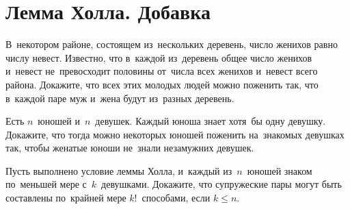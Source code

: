 
\section*{Лемма Холла. Добавка}



\begingroup
    \def\abs#1{\lvert #1 \rvert}

\begin{problems}

\item
В~некотором районе, состоящем из~нескольких деревень, число женихов равно числу
невест.
Известно, что в~каждой из~деревень общее число женихов и~невест не~превосходит
половины от~числа всех женихов и~невест всего района.
Докажите, что всех этих молодых людей можно поженить так, что в~каждой паре муж
и~жена будут из~разных деревень.

\item
Есть $n$~юношей и~$n$~девушек.
Каждый юноша знает хотя~бы одну девушку.
Докажите, что тогда можно некоторых юношей поженить на~знакомых девушках так,
чтобы женатые юноши не~знали незамужних девушек.

\item
Пусть выполнено условие леммы Холла, и~каждый из~$n$~юношей знаком по~меньшей
мере с~$k$~девушками.
Докажите, что супружеские пары могут быть составлены по~крайней мере
$k!$~способами, если $k \leq n$.

\end{problems}

\endgroup %

